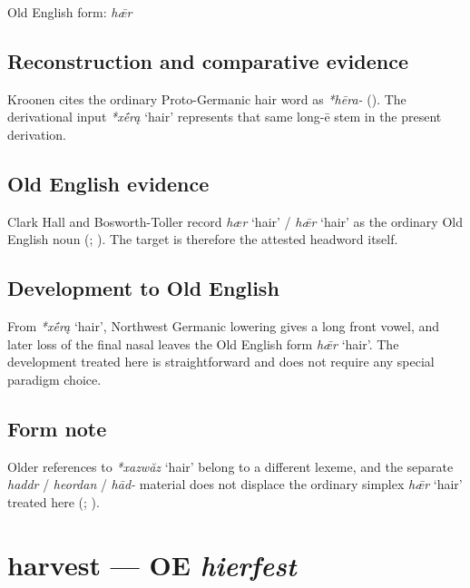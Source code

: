 \documentclass[
  british,
  a4paper,
  openany]{book}
\providecommand{\Recon}[1]{\emph{*#1}}
{\catcode`→=\active \global\def→{\ensuremath{\rightarrow}}}
\providecommand{\texorpdfstring}[2]{#1}
\providecommand{\Recon}[1]{\emph{*#1}}
{\catcode`→=\active \global\def→{\ensuremath{\rightarrow}}}
\begin{document}
Old English form: \emph{hǣr}

\subsection{Reconstruction and comparative
evidence}\label{reconstruction-and-comparative-evidence-25}

Kroonen cites the ordinary Proto-Germanic hair word as \emph{*hēra-}
(). The derivational input
\Recon{xḗrą} `hair' represents that same long-ē stem in the present
derivation.

\subsection{Old English evidence}\label{old-english-evidence-25}

Clark Hall and Bosworth-Toller record \emph{hær} `hair' / \emph{hǣr}
`hair' as the ordinary Old English noun
(;
). The
target is therefore the attested headword itself.

\subsection{Development to Old
English}\label{development-to-old-english-25}

From \Recon{xḗrą} `hair', Northwest Germanic lowering gives a long front
vowel, and later loss of the final nasal leaves the Old English form
\emph{hǣr} `hair'. The development treated here is straightforward and
does not require any special paradigm choice.

\subsection{Form note}\label{form-note-5}

Older references to \Recon{xazwăz} `hair' belong to a different lexeme,
and the separate \emph{haddr} / \emph{heordan} / \emph{hād-} material
does not displace the ordinary simplex \emph{hǣr} `hair' treated here
(;
).

\section{\texorpdfstring{harvest --- OE
\emph{hierfest}}{harvest --- OE hierfest}}\label{harvest-oe-hierfest}
\end{document}
